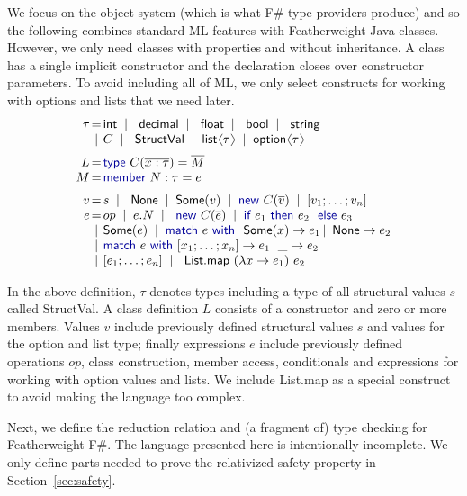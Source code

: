 \documentclass[preprint]{sigplanconf}
\newcommand{\langl}{\begin{picture}(4.5,7)
\put(1.1,2.5){\rotatebox{60}{\line(1,0){5.5}}}
\put(1.1,2.5){\rotatebox{300}{\line(1,0){5.5}}}
\end{picture}}
\newcommand{\rangl}{\begin{picture}(4.5,7)
\put(.9,2.5){\rotatebox{120}{\line(1,0){5.5}}}
\put(.9,2.5){\rotatebox{240}{\line(1,0){5.5}}}
\end{picture}}
\newcommand{\kvd}[1]{\textnormal{\textcolor{kvdclr}{\sffamily #1}}}
\newcommand{\ident}[1]{\textnormal{\sffamily #1}}
\newcommand{\lsep}[0]{\;\; | \;\;}
\newcommand{\narrow}[1]{\hspace{-0.85em} #1 \hspace{-0.85em}}
\begin{document}
We focus on the object system (which is what F\# type providers produce) and so the following combines 
standard ML \cite{sml} features with Featherweight Java \cite{fwjava} classes. However, we only need classes with properties and
without inheritance. A class has a single implicit constructor and the declaration closes over 
constructor parameters. To avoid including all of ML, we only select constructs for working with options and lists
that we need later.
%
\begin{equation*}
\begin{array}{rcl}
 \tau &\narrow{=}& \ident{int} \lsep \ident{decimal} \lsep \ident{float} \lsep \ident{bool} \lsep \ident{string} \\[0.0em]
      &\narrow{|}& C \lsep \ident{StructVal} \lsep \ident{list}\langl\tau\rangl \lsep \ident{option}\langl\tau\rangl \\[0.6em]
 L &\narrow{=}& \kvd{type}~C(\overline{x:\tau}) = \overline{M} \\[0.0em]
 M &\narrow{=}& \kvd{member}~N:\tau=e \\[0.6em]
 v &\narrow{=}& s \lsep \ident{None} \lsep \ident{Some}(v) \lsep \kvd{new}~C(\overline{v}) \lsep [v_1; \ldots; v_n] \\[0.0em]
 e &\narrow{=}& op \lsep e.N \lsep \kvd{new}~C(\overline{e}) \lsep {\kvd{if}~e_1~\kvd{then}~e_2~\kvd{else}~e_3}\\
   &\narrow{|}& \ident{Some}(e)\lsep\kvd{match}~e~\kvd{with}~\ident{Some}(x) \rightarrow e_1 \,|\, \ident{None} \rightarrow e_2 \\
   &\narrow{|}& \kvd{match}~e~\kvd{with}~[x_1; \ldots; x_n] \rightarrow e_1 \,|\, \_ \rightarrow e_2 \\
   &\narrow{|}& [e_1;\ldots;e_n]\lsep \ident{List.map}~(\lambda x\rightarrow e_1)~e_2
\end{array}
\end{equation*}

\noindent
In the above definition, $\tau$ denotes types including a type of all structural values $s$ called
\ident{StructVal}. A class definition $L$ consists of a constructor and zero or more members. Values $v$ include 
previously defined structural values $s$ and values for the option and list type; finally expressions $e$ include 
previously defined operations $op$, class construction, member access, conditionals and expressions for working 
with option values and lists. We include \ident{List.map} as a special construct to avoid making the language too complex.

Next, we define the reduction relation and (a fragment of) type checking for Featherweight F\#.
The language presented here is intentionally incomplete. We only define parts needed to prove
the relativized safety property in Section~\ref{sec:safety}.
\end{document}
